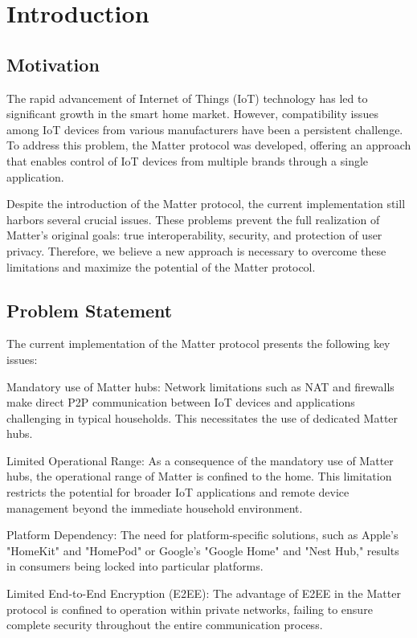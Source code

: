 \documentclass[conference]{IEEEtran}
\begin{document}
\section{Introduction}

\subsection{Motivation}
The rapid advancement of Internet of Things (IoT) technology has led to significant growth in the smart home market. However, compatibility issues among IoT devices from various manufacturers have been a persistent challenge. To address this problem, the Matter protocol was developed, offering an approach that enables control of IoT devices from multiple brands through a single application.

Despite the introduction of the Matter protocol, the current implementation still harbors several crucial issues. These problems prevent the full realization of Matter's original goals: true interoperability, security, and protection of user privacy. Therefore, we believe a new approach is necessary to overcome these limitations and maximize the potential of the Matter protocol.

\subsection{Problem Statement}
The current implementation of the Matter protocol presents the following key issues:

Mandatory use of  Matter hubs: Network limitations such as NAT and firewalls make direct P2P communication between IoT devices and applications challenging in typical households. This necessitates the use of dedicated Matter hubs.

Limited Operational Range: As a consequence of the mandatory use of Matter hubs, the operational range of Matter is confined to the home. This limitation restricts the potential for broader IoT applications and remote device management beyond the immediate household environment.

Platform Dependency: The need for platform-specific solutions, such as Apple's "HomeKit" and "HomePod" or Google's "Google Home" and "Nest Hub," results in consumers being locked into particular platforms.

Limited End-to-End Encryption (E2EE): The advantage of E2EE in the Matter protocol is confined to operation within private networks, failing to ensure complete security throughout the entire communication process.
\end{document}

